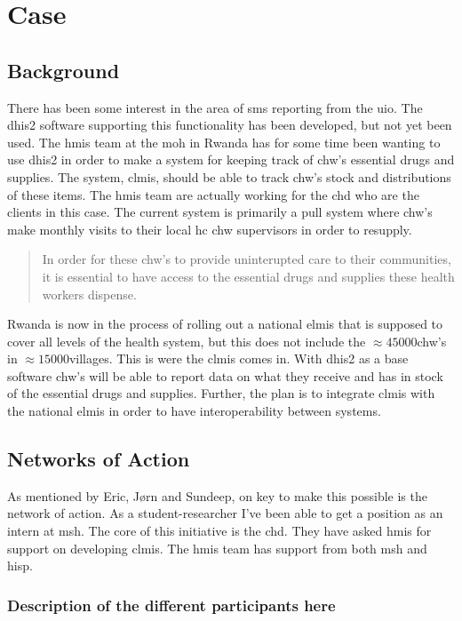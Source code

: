 \chapter{Case}
\section{Background}
There has been some interest in the area of \gls{sms} reporting from the \gls{uio}.
The \gls{dhis2} software supporting this functionality has been developed, but not yet been used.
The \gls{hmis} team at the \gls{moh} in Rwanda has for some time been wanting to use \gls{dhis2} in order to make a system for keeping track of \gls{chw}'s essential drugs and supplies. The system, \gls{clmis}, should be able to track \gls{chw}'s stock and distributions of these items. 
The \gls{hmis} team are actually working for the \gls{chd} who are the clients in this case. 
The current system is primarily a pull system where \gls{chw}'s make monthly visits to their local \gls{hc} \gls{chw} supervisors in order to resupply. 
\begin{quotation}
In order for these \gls{chw}'s to provide uninterupted care to their communities, it is essential to have access to the essential drugs and supplies these health workers dispense.
\end{quotation}

Rwanda is now in the process of rolling out a national \gls{elmis} that is supposed to cover all levels of the health system, but this does not include the $\approx 45000$\gls{chw}'s in $\approx 15000$villages.
This is were the \gls{clmis} comes in. 
With \gls{dhis2} as a base software \gls{chw}'s will be able to report data on what they receive and has in stock of the essential drugs and supplies. 
Further, the plan is to integrate \gls{clmis} with the national \gls{elmis} in order to have interoperability between systems. 

\section{Networks of Action}
As mentioned by Eric, Jørn and Sundeep, on key to make this possible is the network of action. 
As a student-researcher I've been able to get a position as an intern at \gls{msh}.  
The core of this initiative is the \gls{chd}. They have asked \gls{hmis} for support on developing \gls{clmis}. 
The \gls{hmis} team has support from both \gls{msh} and \gls{hisp}. 
\subsection{Description of the different participants here}


